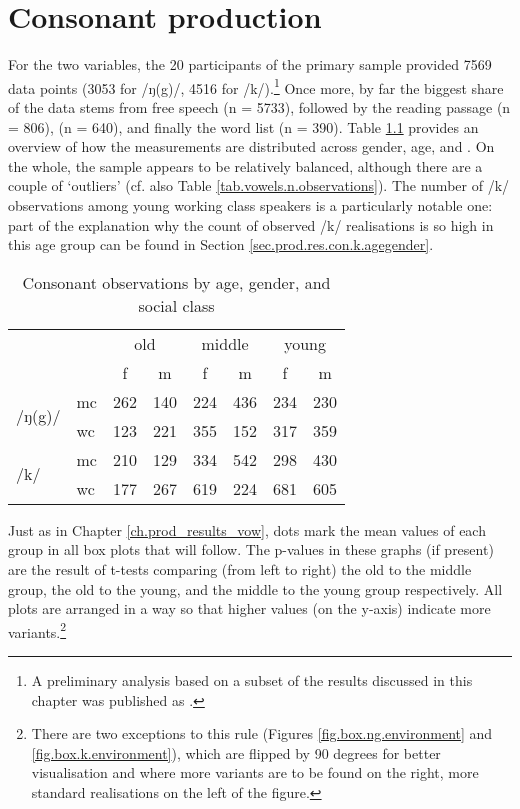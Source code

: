 \chapter{Consonant production}
\label{prod.res.con}

For the two  variables, the 20 participants of the primary sample provided 7569 data points (3053 for /ŋ(g)/, 4516 for /k/).\footnote{A preliminary analysis based on a subset of the results discussed in this chapter was published as \citealt{juskanaccentrevivallipp}.}
Once more, by far the biggest share of the data stems from free speech (n = 5733), followed by the reading passage (n = 806),  (n = 640), and finally the word list (n = 390).
Table \ref{tab.consonants.n.observations} provides an overview of how the measurements are distributed across gender, age, and .
On the whole, the sample appears to be relatively balanced, although there are a couple of `outliers' (cf. also Table \ref{tab.vowels.n.observations}).
The number of /k/ observations among young working class speakers is a particularly notable one: part of the explanation why the count of observed /k/ realisations is so high in this age group can be found in Section \ref{sec.prod.res.con.k.agegender}.

\begin{table}[h!]
	\centering
	\caption{Consonant observations by age, gender, and social class}
	\label{tab.consonants.n.observations}
	\begin{tabular}{llcccccc}
		\hline
		\multicolumn{2}{c}{} & \multicolumn{2}{c}{old} & \multicolumn{2}{c}{middle} & \multicolumn{2}{c}{young}\\
		& & f & m & f & m & f & m\\
		\hline
		\multirow{2}{*}{/ŋ(g)/} & mc & 262 & 140 & 224 & 436 & 234 & 230\\
		& wc & 123 & 221 & 355 & 152 & 317 & 359\\
		\multirow{2}{*}{/k/} & mc & 210 & 129 & 334 & 542 & 298 & 430\\
		& wc & 177 & 267 & 619 & 224 & 681 & 605\\
		\hline
	\end{tabular}
\end{table}

Just as in Chapter \ref{ch.prod_results_vow}, dots mark the mean values of each group in all box plots that will follow.
The p-values in these graphs (if present) are the result of t-tests comparing (from left to right) the old to the middle group, the old to the young, and the middle to the young group respectively.
All plots are arranged in a way so that higher values (on the y-axis) indicate more  variants.\footnote{There are two exceptions to this rule (Figures \ref{fig.box.ng.environment} and \ref{fig.box.k.environment}), which are flipped by 90 degrees for better visualisation and where more  variants are to be found on the right, more standard realisations on the left of the figure.}


